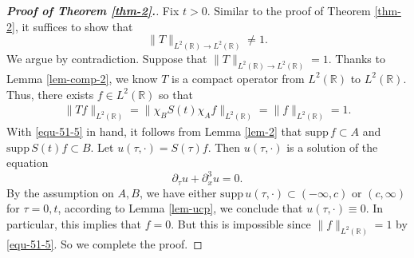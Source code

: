 \documentclass[12pt]{amsart}
\def\R {\mathbb{R}}
\def\d{{\,\rm d}}
\newtheorem{theorem}[proposition]{Theorem}
\theoremstyle{definition}
\newtheorem{definition}[proposition]{Definition}
\newtheorem{example}[proposition]{Example}
\numberwithin{equation}{section}
\begin{document}
\begin{proof}[\bf \textit{Proof of Theorem \ref{thm-2}}.] Fix $t>0$. Similar to the proof of Theorem \ref{thm-2}, it suffices to show that $$
\|T\|_{L^2(\R)\to L^2(\R)}\neq 1.
$$
We argue by contradiction. Suppose that $\|T\|_{L^2(\R)\to L^2(\R)}= 1$. Thanks to Lemma \ref{lem-comp-2}, we know $T$ is a compact operator from $L^2(\R)$ to $L^2(\R)$. Thus, there exists $f\in L^2(\R)$ so that
\begin{align}\label{equ-51-5}
\|Tf\|_{L^2(\R)}=\|\chi_BS(t)\chi_Af\|_{L^2(\R)}=\|f\|_{L^2(\R)}=1.
\end{align}
With \eqref{equ-51-5} in hand, it follows from Lemma \ref{lem-2} that $\mathrm{supp }\, f\subset A$ and $\mathrm{supp }\, S(t)f \subset B$. Let $u(\tau,\cdot)=S(\tau)f$. Then $u(\tau,\cdot)$ is a solution of the equation
$$
\partial_\tau u+\partial_x^3u=0.
$$
By the assumption on $A,B$, we have either $\mathrm{supp }\,u(\tau,\cdot)\subset (-\infty,c)$ or $(c,\infty)$ for $\tau=0,t$, according to Lemma \ref{lem-ucp}, we conclude that $u(\tau,\cdot)\equiv 0$. In particular, this implies that $f=0$. But this is impossible since $\|f\|_{L^2(\R)}=1$ by \eqref{equ-51-5}. So we complete the proof. \end{proof}
%
%
\end{document}
